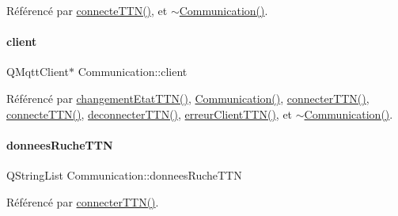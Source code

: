 Référencé par \hyperlink{class_communication_af71587fb1ee9b7460345b7c12372a1eb}{connecte\+T\+T\+N()}, et \hyperlink{class_communication_a75ba08ce908d45251e28e4c1db94e6f4}{$\sim$\+Communication()}.

\mbox{\label{class_communication_a59ae01a54d6c3fde6242c46d802b954b}} 
\paragraph{\texorpdfstring{client}{client}}
{\footnotesize\ttfamily Q\+Mqtt\+Client$\ast$ Communication\+::client\hspace{0.3cm}{\ttfamily [private]}}



Référencé par \hyperlink{class_communication_af249c498d61b4288b9e7d388baf81fc2}{changement\+Etat\+T\+T\+N()}, \hyperlink{class_communication_a7376830f5598b7e3c0eb4434a8a8766e}{Communication()}, \hyperlink{class_communication_aadec726c44e719fa587bd385533eb559}{connecter\+T\+T\+N()}, \hyperlink{class_communication_af71587fb1ee9b7460345b7c12372a1eb}{connecte\+T\+T\+N()}, \hyperlink{class_communication_a8d0cc5c992a2b218a64f57429eea001b}{deconnecter\+T\+T\+N()}, \hyperlink{class_communication_ae1a84ffd9317d0e4e27a6633cef43b64}{erreur\+Client\+T\+T\+N()}, et \hyperlink{class_communication_a75ba08ce908d45251e28e4c1db94e6f4}{$\sim$\+Communication()}.

\mbox{\label{class_communication_a5b7ff98c422c16085e7dc422f2ae51c5}} 
\paragraph{\texorpdfstring{donnees\+Ruche\+T\+TN}{donneesRucheTTN}}
{\footnotesize\ttfamily Q\+String\+List Communication\+::donnees\+Ruche\+T\+TN\hspace{0.3cm}{\ttfamily [private]}}



Référencé par \hyperlink{class_communication_aadec726c44e719fa587bd385533eb559}{connecter\+T\+T\+N()}.

\mbox{\label{class_communication_a7d536b64ee7a5373047c292477d391d5}} 
